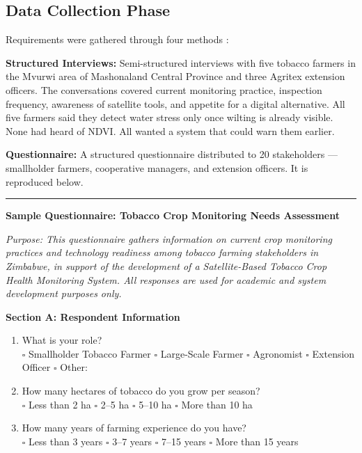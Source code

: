\documentclass[12pt,a4paper]{report}
\begin{document}
\subsection{Data Collection Phase}

Requirements were gathered through four methods \citep{sommerville2016}:

\noindent\textbf{Structured Interviews:} Semi-structured interviews with five tobacco farmers in the Mvurwi area of Mashonaland Central Province and three Agritex extension officers. The conversations covered current monitoring practice, inspection frequency, awareness of satellite tools, and appetite for a digital alternative. All five farmers said they detect water stress only once wilting is already visible. None had heard of NDVI. All wanted a system that could warn them earlier.

\noindent\textbf{Questionnaire:} A structured questionnaire distributed to 20 stakeholders — smallholder farmers, cooperative managers, and extension officers. It is reproduced below.

\vspace{0.5cm}
\noindent\rule{\linewidth}{0.4pt}
\vspace{0.1cm}

\noindent\textbf{Sample Questionnaire: Tobacco Crop Monitoring Needs Assessment}

\vspace{0.2cm}
\noindent\textit{Purpose: This questionnaire gathers information on current crop monitoring practices and technology readiness among tobacco farming stakeholders in Zimbabwe, in support of the development of a Satellite-Based Tobacco Crop Health Monitoring System. All responses are used for academic and system development purposes only.}

\vspace{0.3cm}
\noindent\textbf{Section A: Respondent Information}

\begin{enumerate}
  \item What is your role?\\
  $\square$ Smallholder Tobacco Farmer \quad $\square$ Large-Scale Farmer \quad $\square$ Agronomist \quad $\square$ Extension Officer \quad $\square$ Other: \underline{\hspace{3cm}}

  \item How many hectares of tobacco do you grow per season?\\
  $\square$ Less than 2 ha \quad $\square$ 2--5 ha \quad $\square$ 5--10 ha \quad $\square$ More than 10 ha

  \item How many years of farming experience do you have?\\
  $\square$ Less than 3 years \quad $\square$ 3--7 years \quad $\square$ 7--15 years \quad $\square$ More than 15 years
\end{enumerate}
\end{document}
